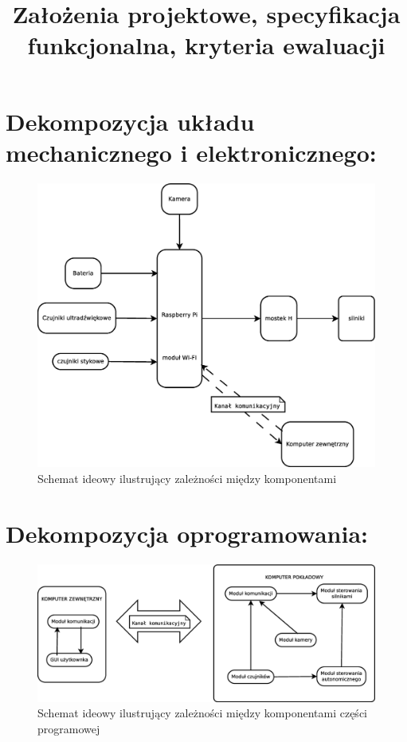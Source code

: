 \documentclass[a4paper]{article}
\title{Założenia projektowe, specyfikacja funkcjonalna, kryteria ewaluacji}
\date{}
\author{}
\begin{document}
\maketitle



\section{Dekompozycja układu mechanicznego i elektronicznego:} 
\begin{figure}[H]
\centering
\includegraphics[width=15cm]{idea_sprzet-mech.eps}
\caption{Schemat ideowy ilustrujący zależności między komponentami}
\end{figure}

\section{Dekompozycja oprogramowania:}
\begin{figure}[H]
\centering
\includegraphics[width=15cm]{idea_programowa.eps}
\caption{Schemat ideowy ilustrujący zależności między komponentami części programowej}
\end{figure}
\end{document}
